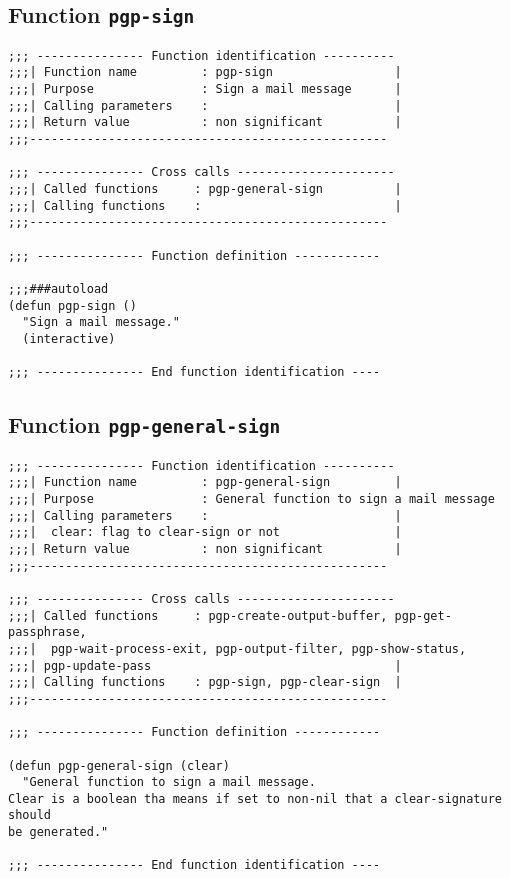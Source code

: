 \subsection{Function {\tt pgp-sign}}
\leavevmode
\begin{verbatim}
;;; --------------- Function identification ----------
;;;| Function name         : pgp-sign                 |
;;;| Purpose               : Sign a mail message      |
;;;| Calling parameters    :                          |
;;;| Return value          : non significant          |
;;;--------------------------------------------------

;;; --------------- Cross calls ----------------------
;;;| Called functions     : pgp-general-sign          |
;;;| Calling functions    :                           |
;;;--------------------------------------------------

;;; --------------- Function definition ------------

;;;###autoload
(defun pgp-sign ()
  "Sign a mail message."
  (interactive)

;;; --------------- End function identification ----
\end{verbatim}
\subsection{Function {\tt pgp-general-sign}}
\leavevmode
\begin{verbatim}
;;; --------------- Function identification ----------
;;;| Function name         : pgp-general-sign         |
;;;| Purpose               : General function to sign a mail message
;;;| Calling parameters    :                          |
;;;|  clear: flag to clear-sign or not                |
;;;| Return value          : non significant          |
;;;--------------------------------------------------

;;; --------------- Cross calls ----------------------
;;;| Called functions     : pgp-create-output-buffer, pgp-get-passphrase,
;;;|  pgp-wait-process-exit, pgp-output-filter, pgp-show-status,
;;;| pgp-update-pass                                  |
;;;| Calling functions    : pgp-sign, pgp-clear-sign  |
;;;--------------------------------------------------

;;; --------------- Function definition ------------

(defun pgp-general-sign (clear)
  "General function to sign a mail message.
Clear is a boolean tha means if set to non-nil that a clear-signature should
be generated."

;;; --------------- End function identification ----
\end{verbatim}
